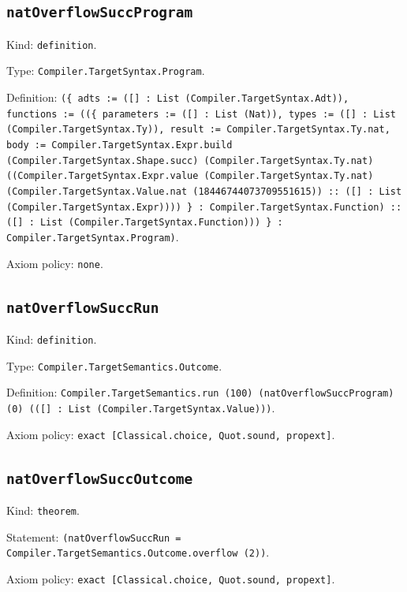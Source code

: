 \documentclass[11pt]{article}
\begin{document}
\subsection*{\texttt{natOverflowSuccProgram}}
\noindent Kind: \texttt{definition}.\par
\noindent Type: \texttt{Compiler.TargetSyntax.Program}.\par
\noindent Definition: \texttt{(\{ adts := ([] : List (Compiler.TargetSyntax.Adt)), functions := ((\{ parameters := ([] : List (Nat)), types := ([] : List (Compiler.TargetSyntax.Ty)), result := Compiler.TargetSyntax.Ty.nat, body := Compiler.TargetSyntax.Expr.build (Compiler.TargetSyntax.Shape.succ) (Compiler.TargetSyntax.Ty.nat) ((Compiler.TargetSyntax.Expr.value (Compiler.TargetSyntax.Ty.nat) (Compiler.TargetSyntax.Value.nat (18446744073709551615)) :: ([] : List (Compiler.TargetSyntax.Expr)))) \} : Compiler.TargetSyntax.Function) :: ([] : List (Compiler.TargetSyntax.Function))) \} : Compiler.TargetSyntax.Program)}.\par
\noindent Axiom policy: \texttt{none}.\par
\subsection*{\texttt{natOverflowSuccRun}}
\noindent Kind: \texttt{definition}.\par
\noindent Type: \texttt{Compiler.TargetSemantics.Outcome}.\par
\noindent Definition: \texttt{Compiler.TargetSemantics.run (100) (natOverflowSuccProgram) (0) (([] : List (Compiler.TargetSyntax.Value)))}.\par
\noindent Axiom policy: \texttt{exact [Classical.choice, Quot.sound, propext]}.\par
\subsection*{\texttt{natOverflowSuccOutcome}}
\noindent Kind: \texttt{theorem}.\par
\noindent Statement: \texttt{(natOverflowSuccRun = Compiler.TargetSemantics.Outcome.overflow (2))}.\par
\noindent Axiom policy: \texttt{exact [Classical.choice, Quot.sound, propext]}.\par
\end{document}
